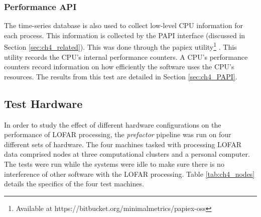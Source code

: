 \subsubsection{Performance API}\label{sec:ch4_papi2}

The time-series database is also used to collect low-level CPU information for each process. This information is collected by the PAPI interface (discussed in Section \ref{sec:ch4_related}). This was done through the papiex utility\footnote
{Available at https://bitbucket.org/minimalmetrics/papiex-oss} \citep{papiex}. This utility records the CPU's internal performance counters. A CPU's performance counters record information on how efficiently the software uses the CPU's resources. The results from this test are detailed in Section \ref{sec:ch4_PAPI}.

\subsection{Test Hardware}

In order to study the effect of different hardware configurations on the performance of LOFAR processing, the \textit{prefactor} pipeline was run on four different sets of hardware. The four machines tasked with processing LOFAR data comprised nodes at three computational clusters and a personal computer. The tests were run while the systems were idle to make sure there is no interference of other software with the LOFAR processing. Table \ref{tab:ch4_nodes} details the specifics of the four test machines.

 \begin{table}
     \begin{center} 
  
         \caption[Hardware specifications of the four test machines.]{CPU, Cache, RAM and Storage specifications of the four test machines. The tested machines span a factor of 1.5x in CPU speed, 4x in cache and RAM Speed and $~$10x in Disk speed.\label{tab:ch4_nodes}}
  \end{center}
 \end{table}


